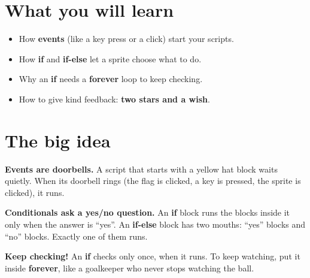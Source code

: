 
\section{What you will learn}
\begin{itemize}[leftmargin=1.2em,itemsep=1pt]
  \item How \textbf{events} (like a key press or a click) start your scripts.
  \item How \textbf{if} and \textbf{if-else} let a sprite choose what to do.
  \item Why an \textbf{if} needs a \textbf{forever} loop to keep checking.
  \item How to give kind feedback: \textbf{two stars and a wish}.
\end{itemize}

\section{The big idea}
\textbf{Events are doorbells.} A script that starts with a yellow  hat block waits quietly. When its doorbell rings (the flag is clicked, a key is pressed, the sprite is clicked), it runs.

\begin{center}
\begin{scratch}[scale=0.8]
\end{scratch}\hspace{0.6cm}
\begin{scratch}[scale=0.8]
\end{scratch}\hspace{0.6cm}
\begin{scratch}[scale=0.8]
\end{scratch}
\end{center}

\textbf{Conditionals ask a yes/no question.} An \textbf{if} block runs the blocks inside it only when the answer is \enquote{yes}. An \textbf{if-else} block has two mouths: \enquote{yes} blocks and \enquote{no} blocks. Exactly one of them runs.

\textbf{Keep checking!} An \textbf{if} checks only once, when it runs. To keep watching, put it inside \textbf{forever}, like a goalkeeper who never stops watching the ball.

